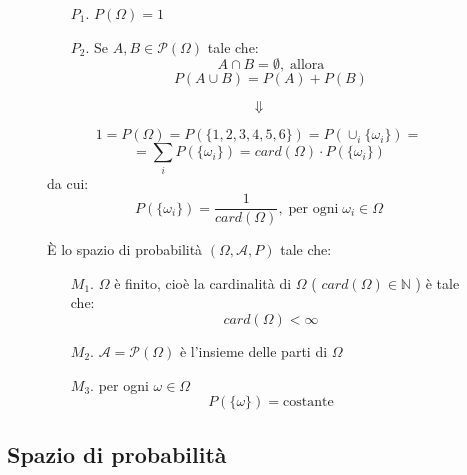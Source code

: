 \documentclass[a4paper]{article}
\theoremstyle{break}
\theoremstyle{break}
\theoremstyle{break}
\theoremstyle{break}
\begin{document}
\begin{figure}[H]
	\begin{definition}
		\begin{enumerate}
			\item[$P_1$.] \( P(\Omega) = 1 \)
			\item[$P_2$.] Se \( A,B \in \mathcal{P}(\Omega) \) tale che:
			      \[
				      A \cap B = \emptyset,\; \text{allora}
			      \]
			      \[
				      P(A \cup B) = P(A) + P(B)
			      \]
		\end{enumerate}
	\end{definition}
\end{figure}
\[
	\Downarrow
\]
\begin{figure}[H]
	\begin{definition}
		\[
			1 = P(\Omega) = P(\{1,2,3,4,5,6\} ) = P(\cup_i \{\omega_i\} ) =
		\]
		\[
			= \sum_i P(\{\omega_i\} ) = card(\Omega) \cdot P(\{\omega_i\} )
		\]
		da cui:
		\[
			P(\{\omega_i\} ) = \frac{1}{card(\Omega)}, \; \text{per ogni} \; \omega_i \in \Omega
		\]
	\end{definition}
\end{figure}

\begin{figure}[H]
	\begin{definition}
		È lo spazio di probabilità \( (\Omega, \mathcal{A}, P) \) tale che:
		\begin{enumerate}
			\item[$M_1$.] \( \Omega \) è finito, cioè la cardinalità di \( \Omega \)
			      ( \( card(\Omega) \in \mathbb{N} \) ) è tale che:
			      \[
				      card(\Omega) < \infty
			      \]
			\item[$M_2$.] \( \mathcal{A} = \mathcal{P}(\Omega) \) è l'insieme delle parti
			      di \( \Omega \)
			\item[$M_3$.] per ogni \( \omega \in \Omega \)
			      \[
				      P(\{\omega\} ) = \text{costante}
			      \]
		\end{enumerate}
	\end{definition}
\end{figure}

\subsection{Spazio di probabilità}
\end{document}

